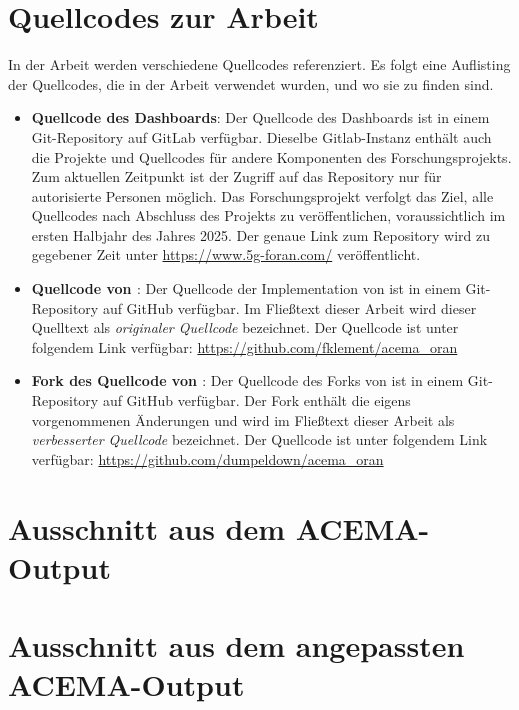 \chapter{Quellcodes zur Arbeit}
\label{app:sourcecode}
In der Arbeit werden verschiedene Quellcodes referenziert. Es folgt eine Auflisting der Quellcodes, die in der Arbeit verwendet wurden, und wo sie zu finden sind.
\begin{itemize}
    \item \textbf{Quellcode des Dashboards}: Der Quellcode des Dashboards ist in einem Git-Repository auf GitLab verfügbar. Dieselbe Gitlab-Instanz enthält auch die Projekte und Quellcodes für andere Komponenten des Forschungsprojekts. Zum aktuellen Zeitpunkt ist der Zugriff auf das Repository nur für autorisierte Personen möglich. Das Forschungsprojekt verfolgt das Ziel, alle Quellcodes nach Abschluss des Projekts zu veröffentlichen, voraussichtlich im ersten Halbjahr des Jahres 2025. Der genaue Link zum Repository wird zu gegebener Zeit unter \url{https://www.5g-foran.com/} veröffentlicht.
    \item \textbf{Quellcode von \citeauthor{klementSecuring6GTransition2024}}: Der Quellcode der Implementation von \citeauthor{klementSecuring6GTransition2024} ist in einem Git-Repository auf GitHub verfügbar. Im Fließtext dieser Arbeit wird dieser Quelltext als \textit{originaler Quellcode} bezeichnet. Der Quellcode ist unter folgendem Link verfügbar: \url{https://github.com/fklement/acema_oran}
    \item \textbf{Fork des Quellcode von \citeauthor{klementSecuring6GTransition2024}}: Der Quellcode des Forks von \citeauthor{klementSecuring6GTransition2024} ist in einem Git-Repository auf GitHub verfügbar. Der Fork enthält die eigens vorgenommenen Änderungen und wird im Fließtext dieser Arbeit als \textit{verbesserter Quellcode} bezeichnet. Der Quellcode ist unter folgendem Link verfügbar: \url{https://github.com/dumpeldown/acema_oran}
\end{itemize}


\chapter{Ausschnitt aus dem ACEMA-Output}
\label{app:acema-output}

\restoregeometry
\chapter{Ausschnitt aus dem angepassten ACEMA-Output}

\restoregeometry

